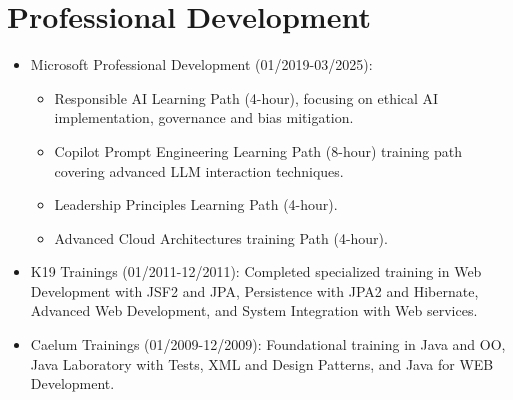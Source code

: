 
\section{Professional Development}
\begin{itemize}
    \item \footnotesize{Microsoft Professional Development (01/2019-03/2025):}
    \begin{itemize}
        \item \scriptsize{Responsible AI Learning Path (4-hour), focusing on ethical AI implementation, governance and bias mitigation.}
        \item \scriptsize{Copilot Prompt Engineering Learning Path (8-hour) training path covering advanced LLM interaction techniques.}
        \item \scriptsize{Leadership Principles Learning Path (4-hour).}
        \item \scriptsize{Advanced Cloud Architectures training Path (4-hour).}
    \end{itemize}
    \item \footnotesize{K19 Trainings (01/2011-12/2011):}\scriptsize{ Completed specialized training in Web Development with JSF2 and JPA, Persistence with JPA2 and Hibernate, Advanced Web Development, and System Integration with Web services.}
    \item \footnotesize{Caelum Trainings (01/2009-12/2009):}\scriptsize{ Foundational training in Java and OO, Java Laboratory with Tests, XML and Design Patterns, and Java for WEB Development.}
\end{itemize}